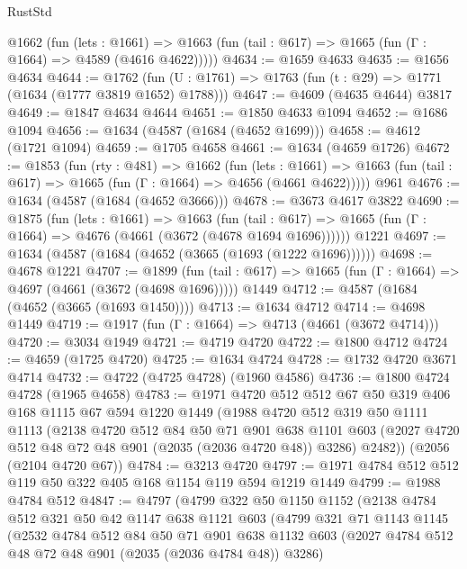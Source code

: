 \begin{lexlean}{RustStd}
\begin{coremodule}
    @1662
      (fun (lets : @1661) =>
      @1663 (fun (tail : @617) => @1665 (fun (Γ : @1664) => @4589 (@4616 @4622)))))
@4634 := @1659 @4633
@4635 := @1656 @4634
@4644 := @1762 (fun (U : @1761) => @1763 (fun (t : @29) => @1771 (@1634 (@1777 @3819 @1652) @1788)))
@4647 := @4609 (@4635 @4644) @3817
@4649 := @1847 @4634 @4644
@4651 := @1850 @4633 @1094
@4652 := @1686 @1094
@4656 := @1634 (@4587 (@1684 (@4652 @1699)))
@4658 := @4612 (@1721 @1094)
@4659 := @1705 @4658
@4661 := @1634 (@4659 @1726)
@4672 := @1853
    (fun (rty : @481) =>
    @1662
      (fun (lets : @1661) =>
      @1663 (fun (tail : @617) => @1665 (fun (Γ : @1664) => @4656 (@4661 @4622)))))
    @961
@4676 := @1634 (@4587 (@1684 (@4652 @3666)))
@4678 := @3673 @4617 @3822
@4690 := @1875
    (fun (lets : @1661) =>
    @1663
      (fun (tail : @617) => @1665 (fun (Γ : @1664) => @4676 (@4661 (@3672 (@4678 @1694 @1696))))))
    @1221
@4697 := @1634 (@4587 (@1684 (@4652 (@3665 (@1693 (@1222 @1696))))))
@4698 := @4678 @1221
@4707 := @1899
    (fun (tail : @617) => @1665 (fun (Γ : @1664) => @4697 (@4661 (@3672 (@4698 @1696)))))
    @1449
@4712 := @4587 (@1684 (@4652 (@3665 (@1693 @1450))))
@4713 := @1634 @4712
@4714 := @4698 @1449
@4719 := @1917 (fun (Γ : @1664) => @4713 (@4661 (@3672 @4714)))
@4720 := @3034 @1949
@4721 := @4719 @4720
@4722 := @1800 @4712
@4724 := @4659 (@1725 @4720)
@4725 := @1634 @4724
@4728 := @1732 @4720 @3671 @4714
@4732 := @4722 (@4725 @4728) (@1960 @4586)
@4736 := @1800 @4724 @4728 (@1965 @4658)
@4783 := @1971
    @4720
    @512
    @512
    @67
    @50
    @319
    @406
    @168
    @1115
    @67
    @594
    @1220
    @1449
    (@1988
      @4720
      @512
      @319
      @50
      @1111
      @1113
      (@2138
        @4720
        @512
        @84
        @50
        @71
        @901
        @638
        @1101
        @603
        (@2027 @4720 @512 @48 @72 @48 @901 (@2035 (@2036 @4720 @48)) @3286)
        @2482))
    (@2056 (@2104 @4720 @67))
@4784 := @3213 @4720
@4797 := @1971 @4784 @512 @512 @119 @50 @322 @405 @168 @1154 @119 @594 @1219 @1449
@4799 := @1988 @4784 @512
@4847 := @4797
    (@4799
      @322
      @50
      @1150
      @1152
      (@2138
        @4784
        @512
        @321
        @50
        @42
        @1147
        @638
        @1121
        @603
        (@4799
          @321
          @71
          @1143
          @1145
          (@2532
            @4784
            @512
            @84
            @50
            @71
            @901
            @638
            @1132
            @603
            (@2027 @4784 @512 @48 @72 @48 @901 (@2035 (@2036 @4784 @48)) @3286)

\end{coremodule}
\end{lexlean}
